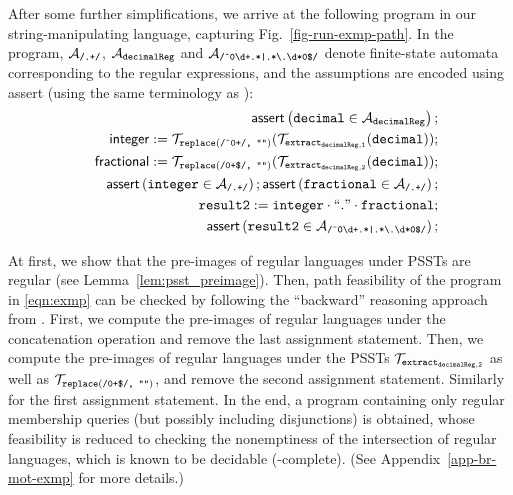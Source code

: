 After some further simplifications, we arrive at the following program
in our string-manipulating language, capturing Fig.~\ref{fig-run-exmp-path}.  In
the program, $\mathcal{A}_{\scriptsize\mbox{\tt/.+/}}$, $\mathcal{A}_{\tt decimalReg}$
and
$\mathcal{A}_{\scriptsize\mbox{\tt /\^{}0\textbackslash
    d+.*|.*{\scriptsize\textbackslash}.\textbackslash d*0\$/}}$ denote
finite-state automata corresponding to the regular expressions, and
the assumptions are encoded using \textsf{assert} (using the same
terminology as \cite{CHL+19}):
\begin{eqnarray}\label{eqn:exmp}
& & \textsf{assert}\left(\tt decimal \in \mathcal{A}_{decimalReg}\right);\nonumber \\
& & \sf integer  := \tt  \mathcal{T}_{\tt replace(\mbox{\scriptsize \tt /\^{}0+/, ""})}(\mathcal{T}_{\tt extract_{decimalReg,1}}(decimal));\nonumber \\
& & \sf fractional  := \tt  \mathcal{T}_{\scriptsize\tt replace(\mbox{\tt /0+\$/, ""})}(\mathcal{T}_{\tt extract_{decimalReg,2}}(decimal)); \\
&&  \textsf{assert}\left(\tt integer \in \mathcal{A}_{\scriptsize\mbox{\tt/.+/}}\right); 
\textsf{assert}\left(\tt fractional \in \mathcal{A}_{\scriptsize\mbox{\tt/.+/}}\right); \nonumber\\
 && \tt result2 := integer \cdot ``." \cdot fractional; \nonumber\\
 && \textsf{assert}\left(\tt result2 \in \mathcal{A}_{\scriptsize\mbox{\tt /\^{}0\textbackslash d+.*|.*{\scriptsize\textbackslash}.\textbackslash d*0\$/}}\right); \nonumber
\end{eqnarray}
\vspace{-4mm}

At first, we show that the pre-images of regular languages under PSSTs are regular (see Lemma~\ref{lem:psst_preimage}).
Then, path feasibility of the program in \eqref{eqn:exmp} can be checked by following the ``backward'' reasoning approach from \cite{CHL+19}.
First, we compute the pre-images of regular languages under the concatenation operation and remove the last assignment statement. Then, we compute the pre-images of regular languages under the PSSTs $\mathcal{T}_{\tt extract_{decimalReg,2}}$ as well as $\mathcal{T}_{\scriptsize\tt replace(\mbox{\tt /0+\$/, ""})}$, and remove the second assignment statement. Similarly for the first assignment statement. In the end, a program containing only regular membership queries (but possibly including disjunctions) is obtained, whose feasibility is reduced to checking the nonemptiness of the intersection of regular languages, which is known to be decidable (\pspace-complete). (See Appendix~\ref{app-br-mot-exmp} for more details.)
